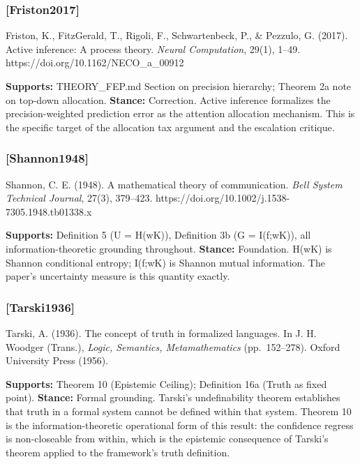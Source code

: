 \documentclass[
]{article}
\begin{document}
\subsubsection{{[}Friston2017{]}}\label{friston2017}

Friston, K., FitzGerald, T., Rigoli, F., Schwartenbeck, P., \& Pezzulo,
G. (2017). Active inference: A process theory. \emph{Neural
Computation}, 29(1), 1--49. https://doi.org/10.1162/NECO\_a\_00912

\textbf{Supports:} THEORY\_FEP.md Section on precision hierarchy;
Theorem 2a note on top-down allocation. \textbf{Stance:} Correction.
Active inference formalizes the precision-weighted prediction error as
the attention allocation mechanism. This is the specific target of the
allocation tax argument and the escalation critique.

\subsubsection{{[}Shannon1948{]}}\label{shannon1948}

Shannon, C. E. (1948). A mathematical theory of communication.
\emph{Bell System Technical Journal}, 27(3), 379--423.
https://doi.org/10.1002/j.1538-7305.1948.tb01338.x

\textbf{Supports:} Definition 5 (U = H(w\textbar K)), Definition 3b (G =
I(f;w\textbar K)), all information-theoretic grounding throughout.
\textbf{Stance:} Foundation. H(w\textbar K) is Shannon conditional
entropy; I(f;w\textbar K) is Shannon mutual information. The paper's
uncertainty measure is this quantity exactly.

\subsubsection{{[}Tarski1936{]}}\label{tarski1936}

Tarski, A. (1936). The concept of truth in formalized languages. In J.
H. Woodger (Trans.), \emph{Logic, Semantics, Metamathematics}
(pp.~152--278). Oxford University Press (1956).

\textbf{Supports:} Theorem 10 (Epistemic Ceiling); Definition 16a (Truth
as fixed point). \textbf{Stance:} Formal grounding. Tarski's
undefinability theorem establishes that truth in a formal system cannot
be defined within that system. Theorem 10 is the information-theoretic
operational form of this result: the confidence regress is non-closeable
from within, which is the epistemic consequence of Tarski's theorem
applied to the framework's truth definition.
\end{document}
